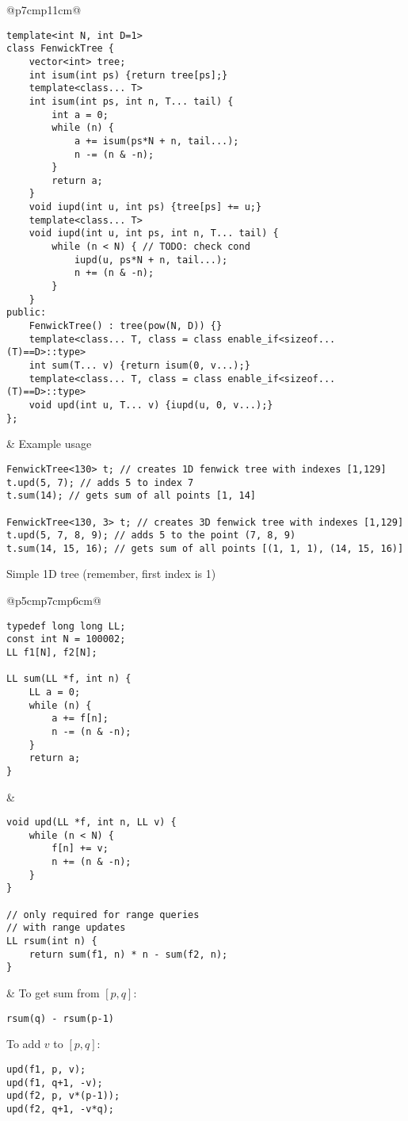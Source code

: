 \documentclass[letterpaper]{article}
\begin{document}
\begin{tabular}{@{}p{7cm}p{11cm}@{}}
    \vspace*{-1em}
    \begin{lstlisting}
template<int N, int D=1>
class FenwickTree {
	vector<int> tree;
	int isum(int ps) {return tree[ps];}
	template<class... T>
	int isum(int ps, int n, T... tail) {
		int a = 0;
		while (n) {
			a += isum(ps*N + n, tail...);
			n -= (n & -n);
		}
		return a;
	}
	void iupd(int u, int ps) {tree[ps] += u;}
	template<class... T>
	void iupd(int u, int ps, int n, T... tail) {
		while (n < N) { // TODO: check cond
			iupd(u, ps*N + n, tail...);
			n += (n & -n);
		}
	}
public:
	FenwickTree() : tree(pow(N, D)) {}
	template<class... T, class = class enable_if<sizeof...(T)==D>::type>
	int sum(T... v) {return isum(0, v...);}
	template<class... T, class = class enable_if<sizeof...(T)==D>::type>
	void upd(int u, T... v) {iupd(u, 0, v...);}
};
\end{lstlisting}
     &
    Example usage

    \begin{lstlisting}
FenwickTree<130> t; // creates 1D fenwick tree with indexes [1,129]
t.upd(5, 7); // adds 5 to index 7
t.sum(14); // gets sum of all points [1, 14]

FenwickTree<130, 3> t; // creates 3D fenwick tree with indexes [1,129]
t.upd(5, 7, 8, 9); // adds 5 to the point (7, 8, 9)
t.sum(14, 15, 16); // gets sum of all points [(1, 1, 1), (14, 15, 16)]
\end{lstlisting}
\end{tabular}

Simple 1D tree (remember, first index is 1)

\begin{tabular}{@{}p{5cm}p{7cm}p{6cm}@{}}
    \vspace*{-1em}
    \begin{lstlisting}
typedef long long LL;
const int N = 100002;
LL f1[N], f2[N];

LL sum(LL *f, int n) {
	LL a = 0;
	while (n) {
		a += f[n];
		n -= (n & -n);
	}
	return a;
}
\end{lstlisting}
     &
    \vspace*{-1em}
    \begin{lstlisting}
void upd(LL *f, int n, LL v) {
	while (n < N) {
		f[n] += v;
		n += (n & -n);
	}
}

// only required for range queries
// with range updates
LL rsum(int n) {
	return sum(f1, n) * n - sum(f2, n);
}
\end{lstlisting}
     &
    To get sum from $[p,q]$:
    \begin{lstlisting}
rsum(q) - rsum(p-1)
\end{lstlisting}

    To add $v$ to $[p,q]$:

    \begin{lstlisting}
upd(f1, p, v);
upd(f1, q+1, -v);
upd(f2, p, v*(p-1));
upd(f2, q+1, -v*q);
\end{lstlisting}
\end{tabular}
\end{document}
